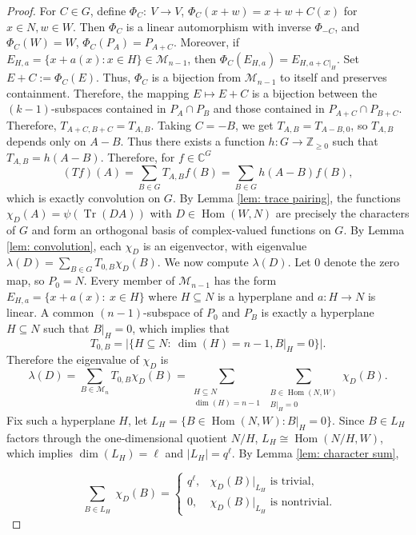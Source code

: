 \documentclass[11pt]{article}
\theoremstyle{definition}
\newcommand{\Hom}{\operatorname{Hom}}
\newcommand{\Tr}{\operatorname{Tr}}
\begin{document}
\begin{proof}
For $C\in G$, define $\Phi_C:\ V\to V$, $\Phi_C(x+w)=x+w+C(x)$ for $x\in N, w\in W$. Then $\Phi_C$ is a linear automorphism with inverse $\Phi_{-C}$, and $\Phi_C(W)=W$, $\Phi_C(P_A)=P_{A+C}$. Moreover, if $E_{H,a}=\{x+a(x): x\in H\}\in\mathcal{M}_{n-1}$, then $\Phi_C(E_{H,a})=E_{H,a+C|_H}$. Set $E+C:=\Phi_C(E)$. Thus, $\Phi_C$ is a bijection from $\mathcal{M}_{n-1}$ to itself and preserves containment. 
Therefore, the mapping $E\mapsto E+C$ is a bijection between the $(k-1)$-subspaces contained in $P_A\cap P_B$ and those contained in $P_{A+C}\cap P_{B+C}$. Therefore, $T_{A+C,B+C}=T_{A,B}$. Taking $C=-B$, we get $T_{A,B}=T_{A-B,0}$, so $T_{A,B}$ depends only on $A-B$. Thus there exists a function $h: G \to \mathbb{Z}_{\geq0}$ such that $T_{A,B} = h(A-B)$. Therefore, for $f\in\mathbb{C}^G$
\[
(Tf)(A) = \sum_{B \in G} T_{A,B} f(B) = \sum_{B \in G} h(A-B) f(B),
\]
which is exactly convolution on $G$. By Lemma \ref{lem: trace pairing}, the functions $\chi_D(A)=\psi(\Tr(DA))$ with $D\in\Hom(W,N)$ are precisely the characters of $G$ and form an orthogonal basis of complex-valued functions on $G$. By Lemma \ref{lem: convolution}, each $\chi_D$ is an eigenvector, with eigenvalue $\lambda(D)=\sum_{B\in G}T_{0,B}\chi_D(B)$. We now compute $\lambda(D)$. Let $0$ denote the zero map, so $P_0=N$. Every member of $\mathcal{M}_{n-1}$ has the form $E_{H,a}=\{x+a(x):\ x\in H\}$ where $H\subseteq N$ is a hyperplane and $a: H\to N$ is linear. A common $(n-1)$-subspace of $P_0$ and $P_B$ is exactly a hyperplane $H\subseteq N$ such that $B|_H=0$, which implies that 
\[
    T_{0,B}=|\{H\subseteq N:\ \dim(H)=n-1, B|_H=0\}|.
\]
Therefore the eigenvalue of $\chi_D$ is
\[
\lambda(D)=\sum_{B\in\mathcal{M}_n}T_{0,B}\chi_D(B)
=\sum_{\substack{H\subseteq N\\ \dim (H)=n-1}}
  \sum_{\substack{B\in\Hom(N,W)\\ B|_H=0}}\chi_D(B).
\]
Fix such a hyperplane $H$, let $L_H=\{B\in\Hom(N,W):B|_H=0\}$. Since $B\in L_H$ factors through the one-dimensional quotient $N/H$, $L_H\cong \Hom(N/H,W)$, which implies $\dim(L_H)=\ell$ and $|L_H|=q^\ell$. By Lemma \ref{lem: character sum}, 

\[
\sum_{\substack{B\in L_H}}\chi_D(B)=
\begin{cases} 
q^\ell, & \chi_D(B)|_{L_H} \text{ is trivial,} \\
0, & \chi_D(B)|_{L_H} \text{ is nontrivial.}
\end{cases}
\]


\end{proof}
\end{document}
